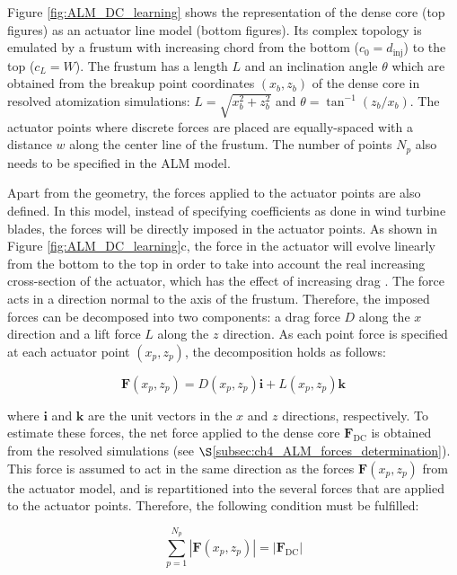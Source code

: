 Figure \ref{fig:ALM_DC_learning} shows the representation of the dense core (top figures) as an actuator line model (bottom figures). Its complex topology is emulated by a frustum with increasing chord from the bottom ($c_0 = d_\mathrm{inj}$) to the top ($c_L = W$). The frustum has a length $L$ and an inclination angle $\theta$ which are obtained from the breakup point coordinates $(x_b, z_b)$ of the dense core in resolved atomization simulations: $L = \sqrt{x_b^2 + z_b^2}$ and $\theta = \tan^{-1} \left( z_b / x_b\right)$. The actuator points where discrete forces are placed are equally-spaced with a distance $w$ along the center line of the frustum. The number of points $N_p$ also needs to be specified in the ALM model.

Apart from the geometry, the forces applied to the actuator points are also defined. In this model, instead of specifying coefficients as done in wind turbine blades, the forces will be directly imposed in the actuator points. As shown in Figure \ref{fig:ALM_DC_learning}c, the force in the actuator will evolve linearly from the bottom to the top in order to take into account the real increasing cross-section of the actuator, which has the effect of increasing drag . The force acts in a direction normal to the axis of the frustum. Therefore, the imposed forces can be decomposed into two components: a drag force $D$ along the $x$ direction and a lift force $L$ along the $z$ direction. As each point force is specified at each actuator point $\left( x_p, z_p \right)$, the decomposition holds as follows:

\begin{equation}
\textbf{F} \left( x_p, z_p \right) = D \left( x_p, z_p \right) \textbf{i} + L \left( x_p, z_p \right) \textbf{k} 
\end{equation}

where $\textbf{i}$ and $\textbf{k}$ are the unit vectors in the $x$ and $z$ directions, respectively. To estimate these forces, the net force applied to the dense core $\textbf{F}_\mathrm{DC}$ is obtained from the resolved simulations (see $\S$\ref{subsec:ch4_ALM_forces_determination}). This force is assumed to act in the same direction as the forces $\textbf{F} \left( x_p, z_p \right)$ from the actuator model, and is repartitioned into the several forces that are applied to the actuator points. Therefore, the following condition must be fulfilled:

\begin{equation}
\sum_{p=1}^{N_p} | \textbf{F} \left( x_p, z_p \right)| = | \textbf{F}_\mathrm{DC} |
\end{equation}

